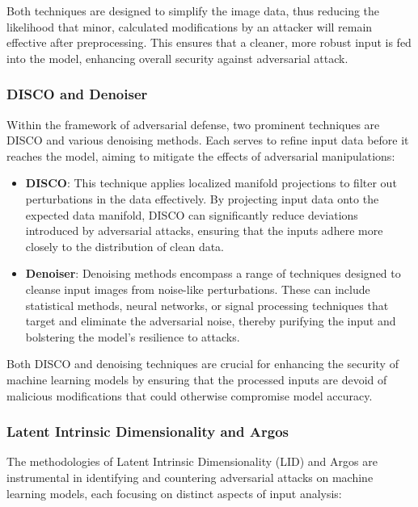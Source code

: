 \documentclass[letterpaper,twocolumn,10pt]{article}
\begin{document}
Both techniques are designed to simplify the image data, thus reducing the likelihood that minor, calculated modifications by an attacker will remain effective after preprocessing. This ensures that a cleaner, more robust input is fed into the model, enhancing overall security against adversarial attack.


\subsubsection{DISCO and Denoiser}

Within the framework of adversarial defense, two prominent techniques are DISCO and various denoising methods. Each serves to refine input data before it reaches the model, aiming to mitigate the effects of adversarial manipulations:

\begin{itemize}
    \item \textbf{DISCO}: This technique applies localized manifold projections to filter out perturbations in the data effectively. By projecting input data onto the expected data manifold, DISCO can significantly reduce deviations introduced by adversarial attacks, ensuring that the inputs adhere more closely to the distribution of clean data.
    
    \item \textbf{Denoiser}: Denoising methods encompass a range of techniques designed to cleanse input images from noise-like perturbations. These can include statistical methods, neural networks, or signal processing techniques that target and eliminate the adversarial noise, thereby purifying the input and bolstering the model’s resilience to attacks.
\end{itemize}

Both DISCO and denoising techniques are crucial for enhancing the security of machine learning models by ensuring that the processed inputs are devoid of malicious modifications that could otherwise compromise model accuracy.

\subsubsection{Latent Intrinsic Dimensionality and Argos}

The methodologies of Latent Intrinsic Dimensionality (LID) and Argos are instrumental in identifying and countering adversarial attacks on machine learning models, each focusing on distinct aspects of input analysis:
\end{document}
